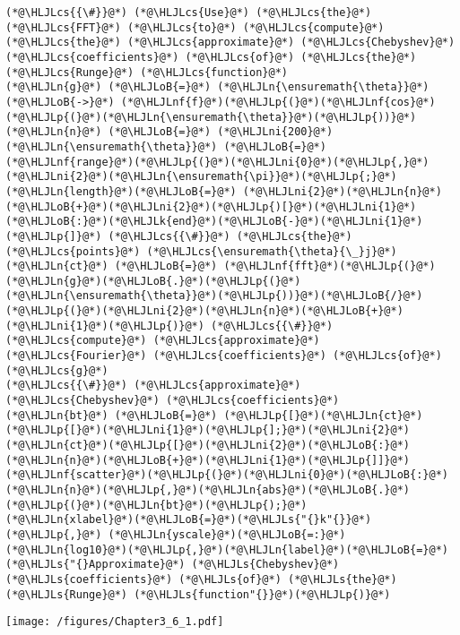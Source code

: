 \documentclass[12pt,a4paper]{article}
\newcommand{\HLJLk}[1]{\textcolor[RGB]{148,91,176}{\textbf{#1}}}
\newcommand{\HLJLn}[1]{#1}
\newcommand{\HLJLnf}[1]{\textcolor[RGB]{66,102,213}{#1}}
\newcommand{\HLJLs}[1]{\textcolor[RGB]{201,61,57}{#1}}
\newcommand{\HLJLni}[1]{\textcolor[RGB]{59,151,46}{#1}}
\newcommand{\HLJLoB}[1]{\textcolor[RGB]{102,102,102}{\textbf{#1}}}
\newcommand{\HLJLp}[1]{#1}
\newcommand{\HLJLcs}[1]{\textcolor[RGB]{153,153,119}{\textit{#1}}}
\begin{document}
\begin{lstlisting}
(*@\HLJLcs{{\#}}@*) (*@\HLJLcs{Use}@*) (*@\HLJLcs{the}@*) (*@\HLJLcs{FFT}@*) (*@\HLJLcs{to}@*) (*@\HLJLcs{compute}@*) (*@\HLJLcs{the}@*) (*@\HLJLcs{approximate}@*) (*@\HLJLcs{Chebyshev}@*) (*@\HLJLcs{coefficients}@*) (*@\HLJLcs{of}@*) (*@\HLJLcs{the}@*) (*@\HLJLcs{Runge}@*) (*@\HLJLcs{function}@*)
(*@\HLJLn{g}@*) (*@\HLJLoB{=}@*) (*@\HLJLn{\ensuremath{\theta}}@*) (*@\HLJLoB{->}@*) (*@\HLJLnf{f}@*)(*@\HLJLp{(}@*)(*@\HLJLnf{cos}@*)(*@\HLJLp{(}@*)(*@\HLJLn{\ensuremath{\theta}}@*)(*@\HLJLp{))}@*)
(*@\HLJLn{n}@*) (*@\HLJLoB{=}@*) (*@\HLJLni{200}@*)
(*@\HLJLn{\ensuremath{\theta}}@*) (*@\HLJLoB{=}@*) (*@\HLJLnf{range}@*)(*@\HLJLp{(}@*)(*@\HLJLni{0}@*)(*@\HLJLp{,}@*)(*@\HLJLni{2}@*)(*@\HLJLn{\ensuremath{\pi}}@*)(*@\HLJLp{;}@*)(*@\HLJLn{length}@*)(*@\HLJLoB{=}@*) (*@\HLJLni{2}@*)(*@\HLJLn{n}@*)(*@\HLJLoB{+}@*)(*@\HLJLni{2}@*)(*@\HLJLp{)[}@*)(*@\HLJLni{1}@*)(*@\HLJLoB{:}@*)(*@\HLJLk{end}@*)(*@\HLJLoB{-}@*)(*@\HLJLni{1}@*)(*@\HLJLp{]}@*) (*@\HLJLcs{{\#}}@*) (*@\HLJLcs{the}@*) (*@\HLJLcs{points}@*) (*@\HLJLcs{\ensuremath{\theta}{\_}j}@*)
(*@\HLJLn{ct}@*) (*@\HLJLoB{=}@*) (*@\HLJLnf{fft}@*)(*@\HLJLp{(}@*)(*@\HLJLn{g}@*)(*@\HLJLoB{.}@*)(*@\HLJLp{(}@*)(*@\HLJLn{\ensuremath{\theta}}@*)(*@\HLJLp{))}@*)(*@\HLJLoB{/}@*)(*@\HLJLp{(}@*)(*@\HLJLni{2}@*)(*@\HLJLn{n}@*)(*@\HLJLoB{+}@*)(*@\HLJLni{1}@*)(*@\HLJLp{)}@*) (*@\HLJLcs{{\#}}@*) (*@\HLJLcs{compute}@*) (*@\HLJLcs{approximate}@*) (*@\HLJLcs{Fourier}@*) (*@\HLJLcs{coefficients}@*) (*@\HLJLcs{of}@*) (*@\HLJLcs{g}@*)
(*@\HLJLcs{{\#}}@*) (*@\HLJLcs{approximate}@*) (*@\HLJLcs{Chebyshev}@*) (*@\HLJLcs{coefficients}@*)
(*@\HLJLn{bt}@*) (*@\HLJLoB{=}@*) (*@\HLJLp{[}@*)(*@\HLJLn{ct}@*)(*@\HLJLp{[}@*)(*@\HLJLni{1}@*)(*@\HLJLp{];}@*)(*@\HLJLni{2}@*)(*@\HLJLn{ct}@*)(*@\HLJLp{[}@*)(*@\HLJLni{2}@*)(*@\HLJLoB{:}@*)(*@\HLJLn{n}@*)(*@\HLJLoB{+}@*)(*@\HLJLni{1}@*)(*@\HLJLp{]]}@*) 
(*@\HLJLnf{scatter}@*)(*@\HLJLp{(}@*)(*@\HLJLni{0}@*)(*@\HLJLoB{:}@*)(*@\HLJLn{n}@*)(*@\HLJLp{,}@*)(*@\HLJLn{abs}@*)(*@\HLJLoB{.}@*)(*@\HLJLp{(}@*)(*@\HLJLn{bt}@*)(*@\HLJLp{);}@*)
(*@\HLJLn{xlabel}@*)(*@\HLJLoB{=}@*)(*@\HLJLs{"{}k"{}}@*)(*@\HLJLp{,}@*) (*@\HLJLn{yscale}@*)(*@\HLJLoB{=:}@*)(*@\HLJLn{log10}@*)(*@\HLJLp{,}@*)(*@\HLJLn{label}@*)(*@\HLJLoB{=}@*)(*@\HLJLs{"{}Approximate}@*) (*@\HLJLs{Chebyshev}@*) (*@\HLJLs{coefficients}@*) (*@\HLJLs{of}@*) (*@\HLJLs{the}@*) (*@\HLJLs{Runge}@*) (*@\HLJLs{function"{}}@*)(*@\HLJLp{)}@*)
\end{lstlisting}

\texttt{[image: /figures/Chapter3\_6\_1.pdf]}
\end{document}
